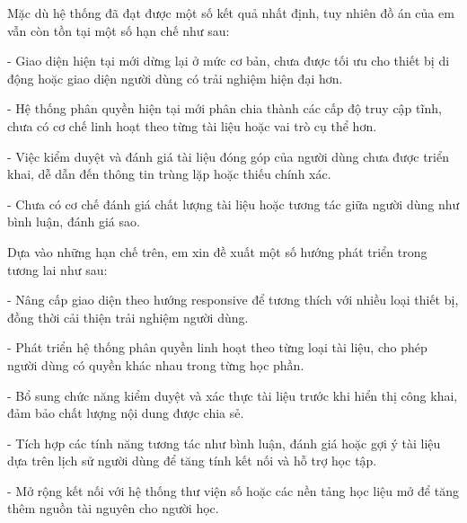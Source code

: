 \documentclass{article}
\begin{document}
	 Mặc dù hệ thống đã đạt được một số kết quả nhất định, tuy nhiên đồ án của em vẫn còn tồn tại một số hạn chế như sau:
	 
	 - Giao diện hiện tại mới dừng lại ở mức cơ bản, chưa được tối ưu cho thiết bị di động hoặc giao diện người dùng có trải nghiệm hiện đại hơn.
	 
	 - Hệ thống phân quyền hiện tại mới phân chia thành các cấp độ truy cập tĩnh, chưa có cơ chế linh hoạt theo từng tài liệu hoặc vai trò cụ thể hơn.
	 
	 - Việc kiểm duyệt và đánh giá tài liệu đóng góp của người dùng chưa được triển khai, dễ dẫn đến thông tin trùng lặp hoặc thiếu chính xác.
	 
	 - Chưa có cơ chế đánh giá chất lượng tài liệu hoặc tương tác giữa người dùng như bình luận, đánh giá sao.
	 
	 Dựa vào những hạn chế trên, em xin đề xuất một số hướng phát triển trong tương lai như sau:
	 
	 - Nâng cấp giao diện theo hướng responsive để tương thích với nhiều loại thiết bị, đồng thời cải thiện trải nghiệm người dùng.
	 
	 - Phát triển hệ thống phân quyền linh hoạt theo từng loại tài liệu, cho phép người dùng có quyền khác nhau trong từng học phần.
	 
	 - Bổ sung chức năng kiểm duyệt và xác thực tài liệu trước khi hiển thị công khai, đảm bảo chất lượng nội dung được chia sẻ.
	 
	 - Tích hợp các tính năng tương tác như bình luận, đánh giá hoặc gợi ý tài liệu dựa trên lịch sử người dùng để tăng tính kết nối và hỗ trợ học tập.
	 
	 - Mở rộng kết nối với hệ thống thư viện số hoặc các nền tảng học liệu mở để tăng thêm nguồn tài nguyên cho người học.
	 
	 \newpage
	 \renewcommand{\refname}{TÀI LIỆU THAM KHẢO}
	 \nocite{*}
	 
	 
\end{document}
